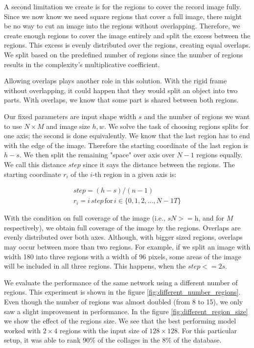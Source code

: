 A second limitation we create is for the regions to cover the record image fully. Since we now know we need square regions that cover a full image, there might be no way to cut an image into the regions without overlapping. Therefore, we create enough regions to cover the image entirely and split the excess between the regions. This excess is evenly distributed over the regions, creating equal overlaps. We split based on the predefined number of regions since the number of regions results in the complexity's multiplicative coefficient.

Allowing overlaps plays another role in this solution. With the rigid frame without overlapping, it could happen that they would split an object into two parts. With overlaps, we know that some part is shared between both regions.

Our fixed parameters are input shape width $s$ and the number of regions we want to use $N \times M$ and image size $h, w$. We solve the task of choosing regions splits for one axis; the second is done equivalently. We know that the last region has to end with the edge of the image. Therefore the starting coordinate of the last region is $h - s$. We then split the remaining "space" over axis over $N-1$ regions equally. We call this distance $step$ since it says the distance between the regions. The starting coordinate $r_i$ of the $i$-th region in a given axis is:

\begin{align*}
step = (h - s) / (n - 1) \\
r_i = {i \, step\,\text{for}\,i \in \{0, 1, 2, \dots, N - 1T\}}
\end{align*}

With the condition on full coverage of the image (i.e., \(s N >= \text{h}\), and for $M$ respectively), we obtain full coverage of the image by the regions. Overlaps are evenly distributed over both axes. Although, with bigger sized regions, overlaps may occur between more than two regions. For example, if we split an image with width 180 into three regions with a width of 96 pixels, some areas of the image will be included in all three regions. This happens, when the $step <= 2 s$.

We evaluate the performance of the same network using a different number of regions. This experiment is shown in the figure \ref{fig:different_number_regions}. Even though the number of regions was almost doubled (from 8 to 15), we only saw a slight improvement in performance. In the figure \ref{fig:different_region_size} we show the effect of the regions size. We see that the best performing model worked with $2\times4$ regions with the input size of $128\times128$. For this particular setup, it was able to rank 90\% of the collages in the 8\% of the database.

